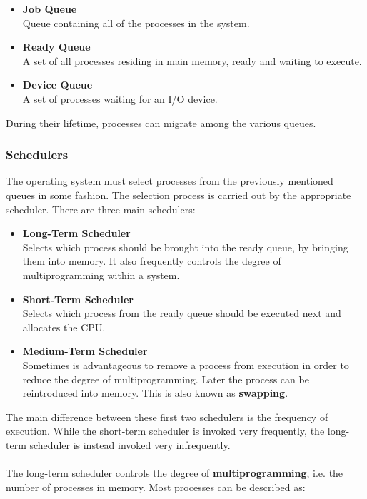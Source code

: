 \documentclass{article}
\begin{document}
\begin{itemize}
	\item \textbf{Job Queue}
	\vspace{.2cm} \\
	Queue containing all of the processes in the system.
	
	\item \textbf{Ready Queue}
	\vspace{.2cm} \\
	A set of all processes residing in main memory, ready and waiting to execute.
	
	\item \textbf{Device Queue}
	\vspace{.2cm} \\
	A set of processes waiting for an I/O device.
\end{itemize}
During their lifetime, processes can migrate among the various queues.

\subsubsection{Schedulers}
The operating system must select processes from the previously mentioned queues in some fashion. The selection process is carried out by the appropriate scheduler. There are three main schedulers:

\begin{itemize}
	\item \textbf{Long-Term Scheduler}
	\vspace{.2cm} \\
	Selects which process should be brought into the ready queue, by bringing them into memory. It also frequently controls the degree of multiprogramming within a system.
	
	\item \textbf{Short-Term Scheduler}
	\vspace{.2cm} \\
	Selects which process from the ready queue should be executed next and allocates the CPU.
	
	\item \textbf{Medium-Term Scheduler}
	\vspace{.2cm} \\
	Sometimes is advantageous to remove a process from execution in order to reduce the degree of multiprogramming. Later the process can be reintroduced into memory. This is also known as \textbf{swapping}.
\end{itemize}
The main difference between these first two schedulers is the frequency of execution. While the short-term scheduler is invoked very frequently, the long-term scheduler is instead invoked very infrequently. \\ \\
The long-term scheduler controls the degree of \textbf{multiprogramming}, i.e. the number of processes in memory. Most processes can be described as:
\end{document}
